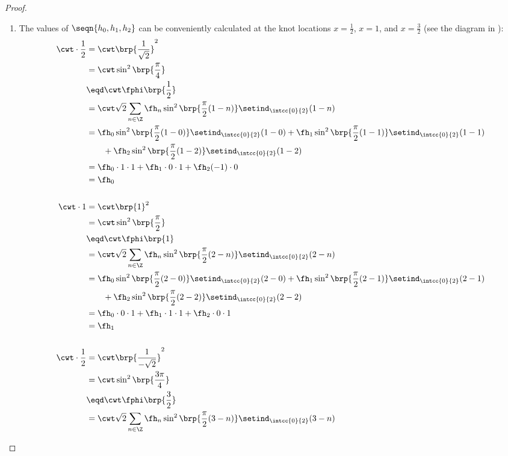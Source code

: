 \begin{proof}
\begin{enumerate}
\begin{enumerate}
      \item The values of $\seqn{h_0,h_1,h_2}$ can be conveniently calculated at the knot locations $x=\frac{1}{2}$, $x=1$, and $x=\frac{3}{2}$ (see the diagram in ):
        \begin{align*}
          \cwt \cdot\frac{1}{2}
            &= \cwt \brp{\frac{1}{\sqrt{2}}}^2
          \\&= \cwt \sin^2\brp{\frac{\pi}{4}}
          \\&\eqd \cwt \fphi\brp{\frac{1}{2}}
          \\&= \cwt \sqrt{2}\sum_{n\in\Z}\fh_n \sin^2\brp{\frac{\pi}{2}(1-n)}\setind_\intcc{0}{2}(1-n)
          \\&=\fh_0 \sin^2\brp{\frac{\pi}{2}(1-0)}\setind_\intcc{0}{2}(1-0)
             +\fh_1 \sin^2\brp{\frac{\pi}{2}(1-1)}\setind_\intcc{0}{2}(1-1)
             \\&\qquad+\fh_2 \sin^2\brp{\frac{\pi}{2}(1-2)}\setind_\intcc{0}{2}(1-2)
          \\&=\fh_0 \cdot1\cdot1
             +\fh_1 \cdot0\cdot1
             +\fh_2 (-1)\cdot0
          \\&=\fh_0
          \\\\
          \cwt \cdot1
            &= \cwt \brp{1}^2
          \\&= \cwt \sin^2\brp{\frac{\pi}{2}}
          \\&\eqd \cwt \fphi\brp{1}
          \\&= \cwt \sqrt{2}\sum_{n\in\Z}\fh_n \sin^2\brp{\frac{\pi}{2}(2-n)}\setind_\intcc{0}{2}(2-n)
          \\&=\fh_0 \sin^2\brp{\frac{\pi}{2}(2-0)}\setind_\intcc{0}{2}(2-0)
             +\fh_1 \sin^2\brp{\frac{\pi}{2}(2-1)}\setind_\intcc{0}{2}(2-1)
             \\&\qquad+\fh_2 \sin^2\brp{\frac{\pi}{2}(2-2)}\setind_\intcc{0}{2}(2-2)
          \\&=\fh_0 \cdot0\cdot1
             +\fh_1 \cdot1\cdot1
             +\fh_2 \cdot0\cdot1
          \\&=\fh_1
          \\\\
          \cwt \cdot\frac{1}{2}
            &= \cwt \brp{\frac{1}{-\sqrt{2}}}^2
          \\&= \cwt \sin^2\brp{\frac{3\pi}{4}}
          \\&\eqd \cwt \fphi\brp{\frac{3}{2}}
          \\&= \cwt \sqrt{2}\sum_{n\in\Z}\fh_n \sin^2\brp{\frac{\pi}{2}(3-n)}\setind_\intcc{0}{2}(3-n)

\end{align*}
\end{enumerate}
\end{enumerate}
\end{proof}
